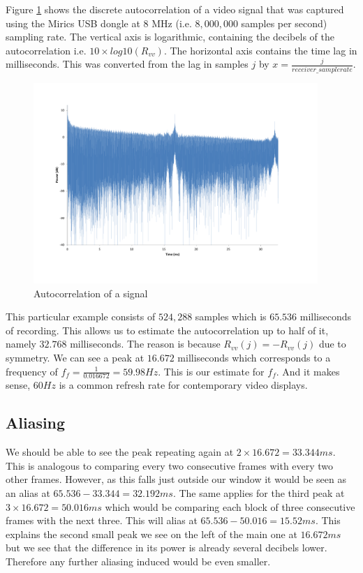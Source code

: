 \documentclass[a4paper,12pt,twoside,openright]{report}
\begin{document}
Figure \ref{fig:autocorr} shows the discrete autocorrelation of a video signal that was captured using the Mirics USB dongle at 8 MHz (i.e. $8,000,000$ samples per second) sampling rate. The vertical axis is logarithmic, containing the decibels of the autocorrelation i.e. $10 \times log10( R_{vv} )$. The horizontal axis contains the time lag in milliseconds. This was converted from the lag in samples $j$ by $x = \frac{j}{receiver\_samplerate}$.

\begin{figure}[h]
\centering
  \includegraphics[width=0.96\textwidth]{autocorr}
  \caption{Autocorrelation of a signal}
  \label{fig:autocorr}
\end{figure}

This particular example consists of $524,288$ samples which is $65.536$ milliseconds of recording. This allows us to estimate the autocorrelation up to half of it, namely $32.768$ milliseconds. The reason is because $R_{vv}(j)=-R_{vv}(j)$ due to symmetry. We can see a peak at $16.672$ milliseconds which corresponds to a frequency of $f_{f} = \frac{1}{0.016672} = 59.98 Hz$. This is our estimate for $f_{f}$. And it makes sense, $60 Hz$ is a common refresh rate for contemporary video displays.

\subsection{Aliasing}
We should be able to see the peak repeating again at $2 \times 16.672 = 33.344 ms$. This is analogous to comparing every two consecutive frames with every two other frames. However, as this falls just outside our window it would be seen as an alias at $65.536-33.344 = 32.192 ms$. The same applies for the third peak at $3 \times 16.672 = 50.016 ms$ which would be comparing each block of three consecutive frames with the next three. This will alias at $65.536 - 50.016 = 15.52 ms$. This explains the second small peak we see on the left of the main one at $16.672 ms$ but we see that the difference in its power is already several decibels lower. Therefore any further aliasing induced would be even smaller.
\end{document}
